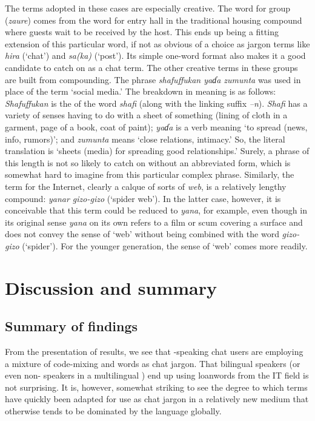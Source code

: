 \documentclass[output=paper
,newtxmath
,modfonts
,nonflat]{langsci/langscibook}
\begin{document}
The  terms adopted in these cases are especially creative. The word for group (\textit{zaure}) comes from the word for entry hall in the traditional  housing compound where guests wait to be received by the host. This ends up being a fitting extension of this particular word, if not as obvious of a choice as jargon terms like \textit{hira} (‘chat’) and \textit{sa(ka)} (‘post’). Its simple one-word format also makes it a good candidate to catch on as a chat term. The other creative  terms in these groups are built from compounding. The phrase \textit{shafuffukan yaɗa zumunta} was used in place of the term ‘social media.’ The breakdown in meaning is as follows: \textit{Shafuffukan} is the  of the word \textit{shafi} (along with the linking suffix \textit{–n}). \textit{Shafi} has a variety of senses having to do with a sheet of something (lining of cloth in a garment, page of a book, coat of paint); \textit{yaɗa} is a verb meaning ‘to spread (news, info, rumors)’; and \textit{zumunta} means ‘close relations, intimacy.’ So, the literal translation is ‘sheets (media) for spreading good relationships.’ Surely, a phrase of this length is not so likely to catch on without an abbreviated form, which is somewhat hard to imagine from this particular complex phrase. Similarly, the term for the Internet, clearly a calque of sorts of  \textit{web}, is a relatively lengthy compound: \textit{yanar gizo-gizo} (‘spider web’). In the latter case, however, it is conceivable that this term could be reduced to \textit{yana}, for example, even though in its original sense \textit{yana} on its own refers to a film or scum covering a surface and does not convey the sense of ‘web’ without being combined with the word \textit{gizo-gizo} (‘spider’). For the younger generation, the sense of ‘web’ comes more readily. 

\section{Discussion and summary}
\subsection{Summary of findings}

From the presentation of results, we see that -speaking chat users are employing a mixture of  code-mixing and  words as chat jargon. That bilingual speakers (or even non- speakers in a multilingual ) end up using  loanwords from the IT field is not surprising. It is, however, somewhat striking to see the degree to which  terms have quickly been adapted for use as chat jargon in a relatively new medium that otherwise tends to be dominated by the  language globally. 
\end{document}
